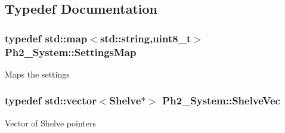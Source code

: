 \subsection{Typedef Documentation}
\hypertarget{namespace_ph2___system_a0ea674c0ee02ac6834ac9a1335111980}{
\subsubsection[{Settings\-Map}]{\setlength{\rightskip}{0pt plus 5cm}typedef std\-::map$<$std\-::string,uint8\-\_\-t$>$ {\bf Ph2\-\_\-\-System\-::\-Settings\-Map}}}\label{namespace_ph2___system_a0ea674c0ee02ac6834ac9a1335111980}
Maps the settings \hypertarget{namespace_ph2___system_a1c21eed494ab8a888694adf3de379dcf}{
\subsubsection[{Shelve\-Vec}]{\setlength{\rightskip}{0pt plus 5cm}typedef std\-::vector$<${\bf Shelve}$\ast$$>$ {\bf Ph2\-\_\-\-System\-::\-Shelve\-Vec}}}\label{namespace_ph2___system_a1c21eed494ab8a888694adf3de379dcf}
Vector of Shelve pointers 